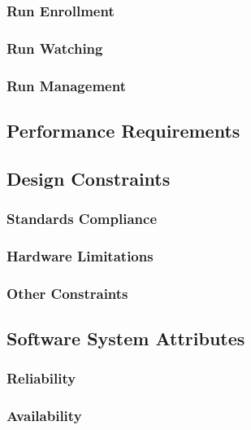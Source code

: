 \documentclass[a4paper]{article}
\begin{document}
        \subsubsection{Run Enrollment}
        
        \subsubsection{Run Watching}
        
        \subsubsection{Run Management}
        
    \subsection{Performance Requirements}
    
    \subsection{Design Constraints}
    
        \subsubsection{Standards Compliance}
        
        \subsubsection{Hardware Limitations}
        
        \subsubsection{Other Constraints}
    
    \subsection{Software System Attributes}
        
        \subsubsection{Reliability}
        
        \subsubsection{Availability}
        
\end{document}

